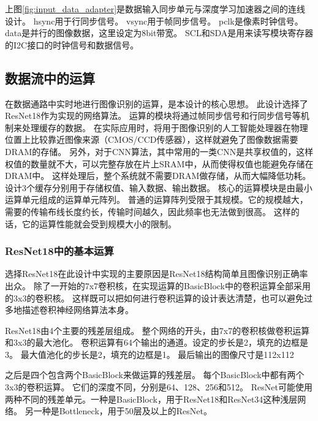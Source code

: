 上图\ref{fig:input_data_adapter}是数据输入同步单元与深度学习加速器之间的连线设计。
hsync用于行同步信号。
vsync用于帧同步信号。
pclk是像素时钟信号。
data是并行的图像数据，这里设定为8bit带宽。
SCL和SDA是用来读写模块寄存器的I2C接口的时钟信号和数据信号。




\subsection{数据流中的运算}

在数据通路中实时地进行图像识别的运算，是本设计的核心思想。
此设计选择了ResNet18作为实现的网络算法。
运算的模块将通过帧同步信号和行同步信号等机制来处理缓存的数据。
在实际应用时，将用于图像识别的人工智能处理器在物理位置上比较靠近图像来源（CMOS/CCD传感器），这样就避免了图像数据需要DRAM的存储。
另外，对于CNN算法，其中常用的一类CNN是共享权值的，这样权值的数量就不大，可以完整存放在片上SRAM中，从而使得权值也能避免存储在DRAM中。
这样处理后，整个系统就不需要DRAM做存储，从而大幅降低功耗。
设计3个缓存分别用于存储权值、输入数据、输出数据。
核心的运算模块是由最小运算单元组成的运算单元阵列。
普通的运算阵列受限于其规模。它的规模越大，需要的传输布线长度约长，传输时间越久，因此频率也无法做到很高。
这样的话，它的运算性能就会受到规模大小的限制。  


\subsubsection{ResNet18中的基本运算}
选择ResNet18在此设计中实现的主要原因是ResNet18结构简单且图像识别正确率出众。
除了一开始的7x7卷积核，在实现运算的BasicBlock中的卷积运算全部采用的3x3的卷积核。
这样既可以把如何进行卷积运算的设计表达清楚，也可以避免过多地描述卷积神经网络算法本身。

ResNet18由4个主要的残差层组成。
整个网络的开头，由7x7的卷积核做卷积运算和3x3的最大池化。
卷积运算有64个输出的通道。设定的步长是2，填充的边框是3。
最大值池化的步长是2，填充的边框是1。
最后输出的图像尺寸是112x112

之后是四个包含两个BasicBlock来做运算的残差层。
每个BasicBlock中都有两个3x3的卷积运算。
它们的深度不同，分别是64、128、256和512。
ResNet可能使用两种不同的残差单元。一种是BasicBlock，用于ResNet18和ResNet34这种浅层网络。
另一种是Bottleneck，用于50层及以上的ResNet。


